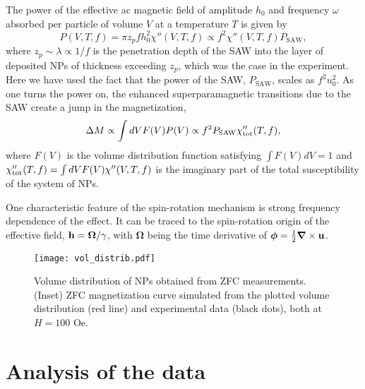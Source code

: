\documentclass[aps,prb,floats,twocolumn]{revtex4}
\begin{document}
The power of the effective ac magnetic field of amplitude $h_0$ and frequency $\omega$ absorbed per particle of volume $V$ at a temperature $T$ is given by \cite{Lectures} 
\begin{equation}\label{P}
P(V,T,f) = \pi z_p f h_0^2 \chi''(V,T,f) \propto  f^2 \chi''(V,T,f) P_{\textrm{SAW}}, 
\end{equation}
where $z_p \sim \lambda \propto 1/f$ is the penetration depth of the SAW into the layer of deposited NPs of thickness exceeding $z_p$, which was the case in the experiment. Here we have used the fact that the power of the SAW, $P_{\textrm{SAW}}$, scales as $ f^2 u_0^2$. As one turns the power on, the enhanced superparamagnetic transitions due to the SAW create a jump in the magnetization,  
\begin{equation}\label{jump}
\Delta M \propto \int dV F(V) P(V) \propto  f^2P_{\textrm{SAW}}\chi''_{\rm tot}(T,f),
\end{equation}
where $F(V)$ is the volume distribution function satisfying $\int F(V) dV = 1$ and $\chi''_{\rm tot}(T,f) = \int dV F(V) \chi''(V,T,f)$
is the imaginary part of the total susceptibility of the system of NPs. 

One characteristic feature of the spin-rotation mechanism is strong frequency dependence of the effect. It can be traced to the spin-rotation origin of the effective field, ${\bf h} = {\bm \Omega}/\gamma$, with ${\bm \Omega}$ being the time derivative of ${\bm \phi} = \frac{1}{2}{\bm \nabla} \times {\bf u}$.

\begin{figure}[ht]
\begin{center}
\texttt{[image: vol\_distrib.pdf]}
\caption{Volume distribution of NPs obtained from ZFC measurements. (Inset) ZFC magnetization curve simulated from the plotted volume distribution (red line) and experimental data (black dots), both at $H=100$ Oe.}
\label{vol_distrib}
\end{center}
\end{figure}

\section{Analysis of the data}\label{analysis}
\end{document}
